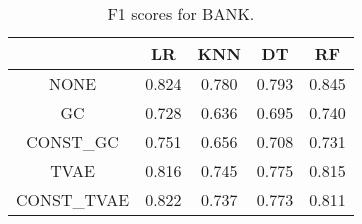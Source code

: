 \begin{table}
\caption{F1 scores for BANK.}
\label{tab:f1-BANK}
\begin{tabular}{ccccc}
\toprule
 & LR & KNN & DT & RF \\
\midrule
NONE & 0.824 & 0.780 & 0.793 & 0.845 \\
GC & 0.728 & 0.636 & 0.695 & 0.740 \\
CONST\_GC & 0.751 & 0.656 & 0.708 & 0.731 \\
TVAE & 0.816 & 0.745 & 0.775 & 0.815 \\
CONST\_TVAE & 0.822 & 0.737 & 0.773 & 0.811 \\
\bottomrule
\end{tabular}
\end{table}
